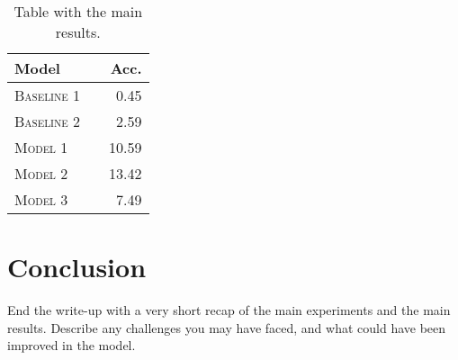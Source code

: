 \documentclass[11pt]{article}
\begin{document}
\begin{table}[h]
\centering
\begin{tabular}{llr}
 \toprule
 Model &  & Acc. \\
 \midrule
 \textsc{Baseline 1} & & 0.45\\
 \textsc{Baseline 2} & & 2.59 \\
 \textsc{Model 1} & & 10.59  \\
 \textsc{Model 2} & &13.42 \\
 \textsc{Model 3} & & 7.49\\
 \bottomrule
\end{tabular}
\caption{\label{tab:results} Table with the main results.}
\end{table}



\section{Conclusion}

End the write-up with a very short recap of the main experiments and the main results. Describe any challenges you may have faced, and what could have been improved in the model.



\end{document}
